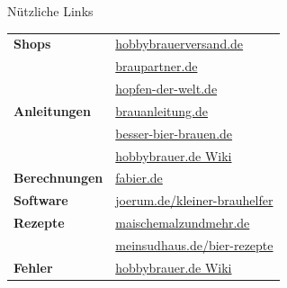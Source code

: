 \documentclass[9pt, ngerman]{beamer}
\begin{document}
\begin{frame}{Nützliche Links}
  \begin{table}
    \begin{tabular}{ll}
      \textbf{Shops}
        & \href{http://www.hobbybrauerversand.de}{hobbybrauerversand.de}\\
        & \href{http://www.braupartner.de}{braupartner.de}\\
        & \href{http://www.hopfen-der-welt.de}{hopfen-der-welt.de}\\
        \midrule
      \textbf{Anleitungen}
        & \href{http://brauanleitung.de}{brauanleitung.de}\\
        & \href{http://www.besser-bier-brauen.de}{besser-bier-brauen.de}\\
        & \href{http://hobbybrauer.de/forum/wiki}{hobbybrauer.de Wiki}\\
        \midrule
      \textbf{Berechnungen}
        & \href{http://fabier.de}{fabier.de}\\
        \midrule
      \textbf{Software}
        & \href{http://www.joerum.de/kleiner-brauhelfer}{joerum.de/kleiner-brauhelfer}\\
        \midrule
      \textbf{Rezepte}
        & \href{https://www.maischemalzundmehr.de}{maischemalzundmehr.de}\\
        & \href{http://meinsudhaus.de/bier-rezepte}{meinsudhaus.de/bier-rezepte}\\
        \midrule
      \textbf{Fehler}
        & \href{http://hobbybrauer.de/forum/wiki/doku.php/bier:fehler}{hobbybrauer.de Wiki}
    \end{tabular}
  \end{table}
\end{frame}
\end{document}
